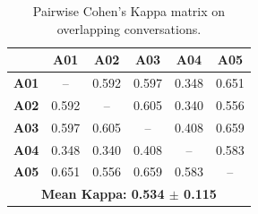 \documentclass{article}
\begin{document}
\begin{table}[t]
\centering
\begin{tabular}{@{}lccccc@{}}
\toprule
 & \textbf{A01} & \textbf{A02} & \textbf{A03} & \textbf{A04} & \textbf{A05} \\ \midrule
\textbf{A01} & -- & 0.592 & 0.597 & 0.348 & 0.651 \\
\textbf{A02} & 0.592 & -- & 0.605 & 0.340 & 0.556 \\
\textbf{A03} & 0.597 & 0.605 & -- & 0.408 & 0.659 \\
\textbf{A04} & 0.348 & 0.340 & 0.408 & -- & 0.583 \\
\textbf{A05} & 0.651 & 0.556 & 0.659 & 0.583 & -- \\
\midrule
\multicolumn{6}{c}{\textbf{Mean Kappa: 0.534 $\pm$ 0.115}} \\
\bottomrule
\end{tabular}
\caption{Pairwise Cohen's Kappa matrix on overlapping conversations.}
\label{tab:kappa_pairwise}
\end{table}










\end{document}
